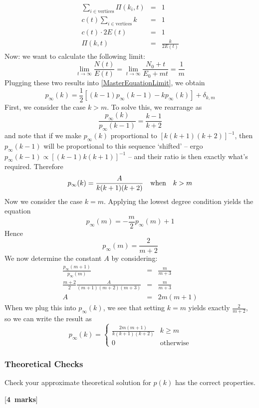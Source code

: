 \documentclass[a4paper,12pt]{article}
\newcounter{nmarks}
\newcommand{\qmarks}[1]{\addtocounter{nmarks}{#1} }
\renewcommand{\qmarks}[1]{\addtocounter{nmarks}{#1} \hspace*{\fill} [\textbf{#1~marks}]}
\begin{document}
\begin{eqnarray*}
\sum_{i\in\mathrm{vertices}} \Pi(k_i,t)&=&1\\
c(t) \sum_{i\in\mathrm{vertices}} k&=&1\\
c(t) \cdot 2E(t)&=&1\\
\Pi(k,t) &=& \frac{k}{2E(t)}
\end{eqnarray*}
Now: we want to calculate the following limit:
$$\lim_{t\to\infty}\frac{N(t)}{E(t)}=\lim_{t\to\infty}\frac{N_0+t}{E_0+mt}=\frac{1}{m}$$
Plugging these two results into \ref{MasterEquationLimit}, we obtain
\begin{equation} \label{MasterEquationLimitPA}
p_\infty(k) = \frac{1}{2}\left[(k-1)p_\infty(k-1) - kp_\infty(k)\right] + \delta_{k,m}
\end{equation}
First, we consider the case $k>m$. To solve this, we rearrange as
$$\frac{p_\infty(k)}{p_\infty(k-1)}=\frac{k-1}{k+2}$$
and note that if we make $p_\infty(k)$ proportional to $\left[k(k+1)(k+2)\right]^{-1}$, then $p_\infty(k-1)$ will be proportional to this sequence `shifted' -- ergo $p_\infty(k-1)\propto \left[(k-1)k(k+1)\right]^{-1}$ -- and their ratio is then exactly what's required. Therefore
$$p_\infty(k)=\frac{A}{k(k+1)(k+2)}\qq{when} k>m$$
Now we consider the case $k=m$. Applying the lowest degree condition yields the equation
$$p_\infty(m)=-\frac{m}{2}p_\infty(m)+1$$
Hence
$$p_\infty(m)=\frac{2}{m+2}$$
We now determine the constant $A$ by considering:
\begin{eqnarray*}
\frac{p_\infty(m+1)}{p_\infty(m)}&=&\frac{m}{m+3}\\
\frac{m+2}{2}\frac{A}{(m+1)(m+2)(m+3)}&=&\frac{m}{m+3}\\
A&=&2m(m+1)
\end{eqnarray*}
When we plug this into $p_\infty(k)$, we see that setting $k=m$ yields exactly $\frac{2}{m+2}$, so we can write the result as
\begin{equation} \label{PAprob}
p_\infty(k)=\begin{cases}
\frac{2m(m+1)}{k(k+1)(k+2)} & k\geq m\\
0 & \mathrm{otherwise}
\end{cases}
\end{equation}

\subsubsection{Theoretical Checks}
Check your approximate theoretical solution for $p(k)$ has the correct properties. \qmarks{4}
\end{document}
